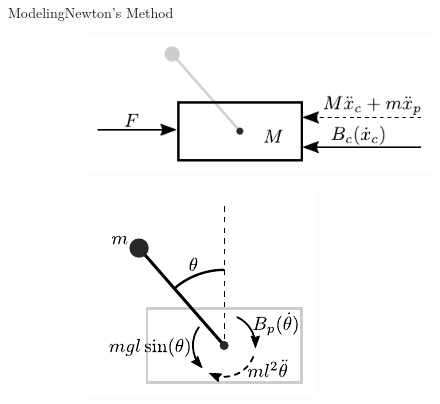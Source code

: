 \begin{frame}{Modeling}{Newton's Method}
  \small
  \begin{figure}[H]
    \vspace{-1cm}\hspace{.1cm}
    \begin{minipage}{0.45\linewidth}
      \begin{figure}[H]
        \hspace{-2cm}
        \includegraphics[width=1.2\linewidth]{figures/freeBodyCart}
      \end{figure}        
    \end{minipage}\hspace{-1cm}
    \begin{minipage}{0.45\linewidth}
      \begin{figure}[H]
        \vspace{-.25cm}
        \includegraphics[width=.8\linewidth]{figures/freeBodyPendulum}
      \end{figure}\hspace{1cm}
    \end{minipage}
  \end{figure}

\end{frame}
